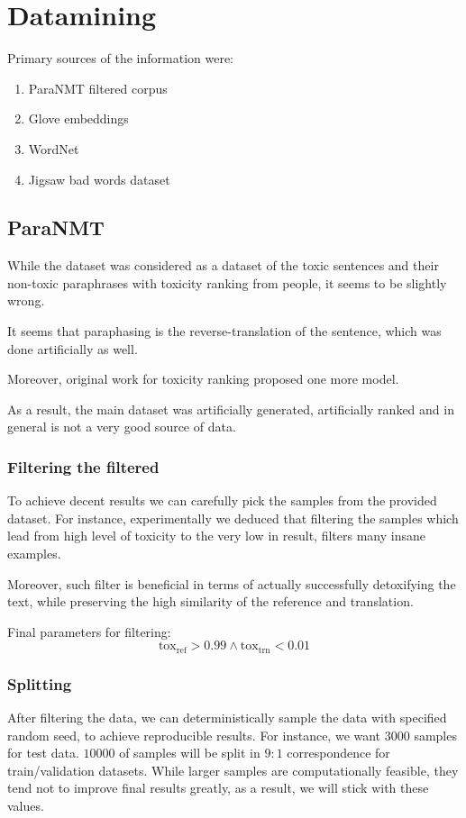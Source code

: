 \section{Datamining}

Primary sources of the information were:

\begin{enumerate}
    \item ParaNMT filtered corpus
    \item Glove embeddings
    \item WordNet
    \item Jigsaw bad words dataset
\end{enumerate}

\subsection{ParaNMT}

While the dataset was considered as a dataset of the toxic sentences and their
non-toxic paraphrases with toxicity ranking from people, it seems to be
slightly wrong.

It seems that paraphasing is the reverse-translation of the sentence, which was
done artificially as well.

Moreover, original work for toxicity ranking proposed one more model.

As a result, the main dataset was artificially generated, artificially ranked
and in general is not a very good source of data.

\subsubsection{Filtering the filtered}

To achieve decent results we can carefully pick the samples from the provided
dataset. For instance, experimentally we deduced that filtering the samples
which lead from high level of toxicity to the very low in result, filters many
insane examples.

Moreover, such filter is beneficial in terms of actually successfully
detoxifying the text, while preserving the high similarity of the reference and
translation.

Final parameters for filtering:
\begin{equation}\text{tox}_\text{ref} > 0.99 \wedge \text{tox}_\text{trn} < 0.01\end{equation}

\subsubsection{Splitting}

After filtering the data, we can deterministically sample the data with
specified random seed, to achieve reproducible results. For instance, we want
\(3000\) samples for test data. \(10000\) of samples will be split in \(9:1\)
correspondence for train/validation datasets. While larger samples are
computationally feasible, they tend not to improve final results greatly, as a
result, we will stick with these values.

